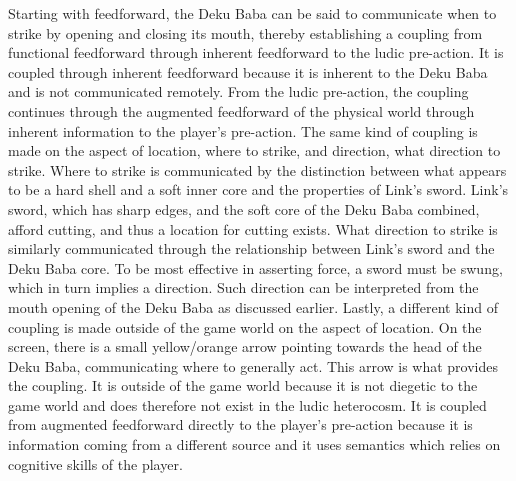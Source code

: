 Starting with feedforward, the Deku Baba can be said to communicate when to strike by opening and closing its mouth, thereby establishing a coupling from functional feedforward through inherent feedforward to the ludic pre-action. It is coupled through inherent feedforward because it is inherent to the Deku Baba and is not communicated remotely. From the ludic pre-action, the coupling continues through the augmented feedforward of the physical world through inherent information to the player's pre-action. The same kind of coupling is made on the aspect of location, where to strike, and direction, what direction to strike. Where to strike is communicated by the distinction between what appears to be a hard shell and a soft inner core and the properties of Link's sword. Link's sword, which has sharp edges, and the soft core of the Deku Baba combined, afford cutting, and thus a location for cutting exists. What direction to strike is similarly communicated through the relationship between Link's sword and the Deku Baba core. To be most effective in asserting force, a sword must be swung, which in turn implies a direction. Such direction can be interpreted from the mouth opening of the Deku Baba as discussed earlier. Lastly, a different kind of coupling is made outside of the game world on the aspect of location. On the screen, there is a small yellow/orange arrow pointing towards the head of the Deku Baba, communicating where to generally act. This arrow is what provides the coupling. It is outside of the game world because it is not diegetic to the game world and does therefore not exist in the ludic heterocosm. It is coupled from augmented feedforward directly to the player's pre-action because it is information coming from a different source and it uses semantics which relies on cognitive skills of the player.

